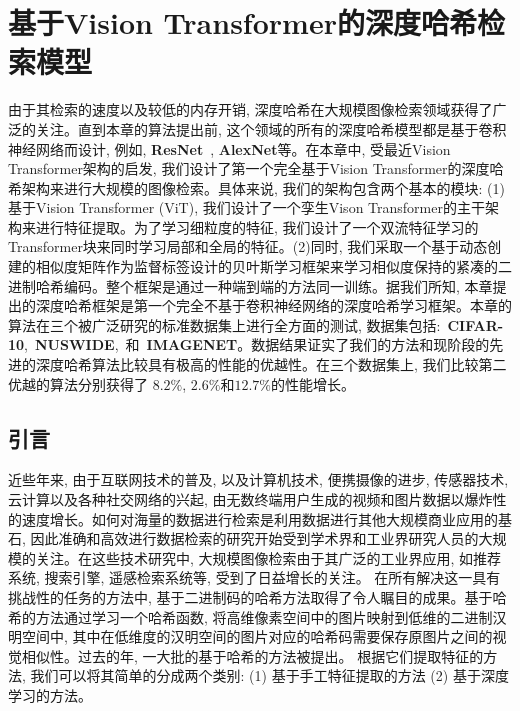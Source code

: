 \chapter{基于Vision Transformer的深度哈希检索模型}
由于其检索的速度以及较低的内存开销, 深度哈希在大规模图像检索领域获得了广泛的关注。直到本章的算法提出前, 这个领域的所有的深度哈希模型都是基于卷积神经网络而设计, 例如, \textbf{ResNet}~\cite{he2016deep}, \textbf{AlexNet}等。在本章中, 受最近Vision Transformer架构的启发, 我们设计了第一个完全基于Vision Transformer的深度哈希架构来进行大规模的图像检索。具体来说, 我们的架构包含两个基本的模块: (1) 基于Vision Transformer (ViT), 我们设计了一个孪生Vison Transformer的主干架构来进行特征提取。为了学习细粒度的特征, 我们设计了一个双流特征学习的Transformer块来同时学习局部和全局的特征。(2)同时, 我们采取一个基于动态创建的相似度矩阵作为监督标签设计的贝叶斯学习框架来学习相似度保持的紧凑的二进制哈希编码。整个框架是通过一种端到端的方法同一训练。据我们所知, 本章提出的深度哈希框架是第一个完全不基于卷积神经网络的深度哈希学习框架。本章的算法在三个被广泛研究的标准数据集上进行全方面的测试, 数据集包括:~\textbf{CIFAR-10},~\textbf{NUSWIDE},~和~\textbf{IMAGENET}。数据结果证实了我们的方法和现阶段的先进的深度哈希算法比较具有极高的性能的优越性。在三个数据集上, 我们比较第二优越的算法分别获得了 $8.2\%$, $2.6 \%$和$12.7\%$的性能增长。

\section{引言}
近些年来, 由于互联网技术的普及, 以及计算机技术, 便携摄像的进步, 传感器技术, 云计算以及各种社交网络的兴起, 由无数终端用户生成的视频和图片数据以爆炸性的速度增长。如何对海量的数据进行检索是利用数据进行其他大规模商业应用的基石, 因此准确和高效进行数据检索的研究开始受到学术界和工业界研究人员的大规模的关注。在这些技术研究中, 大规模图像检索由于其广泛的工业界应用, 如推荐系统, 搜索引擎, 遥感检索系统等, 受到了日益增长的关注。 在所有解决这一具有挑战性的任务的方法中\cite{fu2017fast, ge2013optimized, jegou2010product, malkov2018efficient}, 基于二进制码的哈希方法取得了令人瞩目的成果。基于哈希的方法通过学习一个哈希函数, 将高维像素空间中的图片映射到低维的二进制汉明空间中, 其中在低维度的汉明空间的图片对应的哈希码需要保存原图片之间的视觉相似性。过去的年, 一大批的基于哈希的方法被提出。 根据它们提取特征的方法, 我们可以将其简单的分成两个类别: (1) 基于手工特征提取的方法 (2) 基于深度学习的方法。\par

